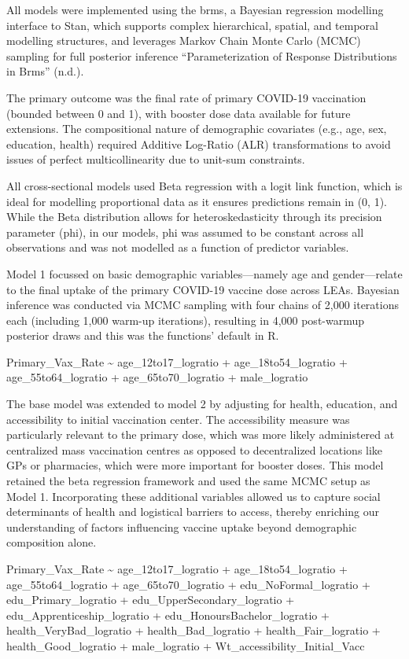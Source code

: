 \documentclass{article}
\begin{document}
All models were implemented using the brms, a Bayesian regression
modelling interface to Stan, which supports complex hierarchical,
spatial, and temporal modelling structures, and leverages Markov Chain
Monte Carlo (MCMC) sampling for full posterior inference
{``Parameterization of {Response} {Distributions} in Brms''} (n.d.).

The primary outcome was the final rate of primary COVID-19 vaccination
(bounded between 0 and 1), with booster dose data available for future
extensions. The compositional nature of demographic covariates (e.g.,
age, sex, education, health) required Additive Log-Ratio (ALR)
transformations to avoid issues of perfect multicollinearity due to
unit-sum constraints.

All cross-sectional models used Beta regression with a logit link
function, which is ideal for modelling proportional data as it ensures
predictions remain in (0, 1). While the Beta distribution allows for
heteroskedasticity through its precision parameter (phi), in our models,
phi was assumed to be constant across all observations and was not
modelled as a function of predictor variables.

Model 1 focussed on basic demographic variables---namely age and
gender---relate to the final uptake of the primary COVID-19 vaccine dose
across LEAs. Bayesian inference was conducted via MCMC sampling with
four chains of 2,000 iterations each (including 1,000 warm-up
iterations), resulting in 4,000 post-warmup posterior draws and this was
the functions' default in R.

Primary\_Vax\_Rate \textasciitilde{} age\_12to17\_logratio +
age\_18to54\_logratio + age\_55to64\_logratio + age\_65to70\_logratio +
male\_logratio

The base model was extended to model 2 by adjusting for health,
education, and accessibility to initial vaccination center. The
accessibility measure was particularly relevant to the primary dose,
which was more likely administered at centralized mass vaccination
centres as opposed to decentralized locations like GPs or pharmacies,
which were more important for booster doses. This model retained the
beta regression framework and used the same MCMC setup as Model 1.
Incorporating these additional variables allowed us to capture social
determinants of health and logistical barriers to access, thereby
enriching our understanding of factors influencing vaccine uptake beyond
demographic composition alone.

Primary\_Vax\_Rate \textasciitilde{} age\_12to17\_logratio +
age\_18to54\_logratio + age\_55to64\_logratio + age\_65to70\_logratio +
edu\_NoFormal\_logratio + edu\_Primary\_logratio +
edu\_UpperSecondary\_logratio + edu\_Apprenticeship\_logratio +
edu\_HonoursBachelor\_logratio + health\_VeryBad\_logratio +
health\_Bad\_logratio + health\_Fair\_logratio + health\_Good\_logratio
+ male\_logratio + Wt\_accessibility\_Initial\_Vacc
\end{document}
